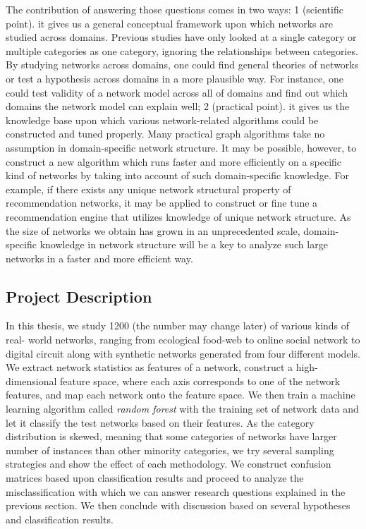 \documentclass{article}
\begin{document}
The contribution of answering those questions comes in two ways: 1 (scientific point). it gives us a general conceptual framework upon which networks are studied across domains. Previous studies have only looked at a single category or multiple categories as one category, ignoring the relationships between categories. By studying networks across domains, one could find general theories of networks or test a hypothesis across domains in a more plausible way.  For instance, one could test validity of a network model across all of domains and find out which domains the network model can explain well; 2 (practical point). it gives us the knowledge base upon which various network-related algorithms could be constructed and tuned properly.  Many practical graph algorithms take no assumption in domain-specific network structure. It may be possible, however, to construct a new algorithm which runs faster and more efficiently on a specific kind of networks by taking into account of such domain-specific knowledge. For example, if there exists any unique network structural property of recommendation networks,  it may be applied to construct or fine tune a recommendation engine that utilizes knowledge of unique network structure. As the size of networks we obtain has grown in an unprecedented scale, domain-specific knowledge in network structure will be a key to analyze such large networks in a faster and more efficient way.

\subsection{Project Description}

In this thesis, we study 1200 (the number may change later) of various kinds of real- world networks, ranging from ecological food-web to online social network to digital circuit along with synthetic networks generated from four different models. We extract network statistics as features of a network, construct a high-dimensional feature space, where each axis corresponds to one of the network features, and map each network onto the feature space. We then train a machine learning algorithm called \textit{random forest} with the training set of network data and let it classify the test networks based on their features. As the category distribution is skewed, meaning that some categories of networks have larger number of instances than other minority categories, we try several sampling strategies and show the effect of each methodology. We construct confusion matrices based upon classification results and proceed to analyze the misclassification with which we can answer research questions explained in the previous section. We then conclude with discussion based on several hypotheses and classification results.
\end{document}
